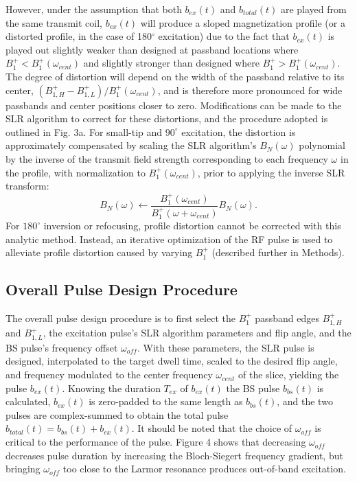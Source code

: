 \documentclass[a4paper,12pt]{article}
\newcommand{\bfullt}{b_{total}(t)}
\newcommand{\bext}{b_{ex}(t)}
\begin{document}
\par However, under the assumption that both $\bext$ and $\bfullt$ are played from the same transmit coil, 
 $\bext$ will produce a sloped magnetization profile (or a distorted profile, in the case of 180$^\circ$ excitation) due to the fact that $\bext$ is played out slightly weaker than designed at passband locations where $B_1^+ <  B_1^+(\omega_{cent})$ and slightly stronger than designed where $B_1^+ > B_1^+(\omega_{cent})$. 
The degree of distortion will depend on the width of the passband relative to its center, $(B_{1,H}^+ - B_{1,L}^+) / B_1^+(\omega_{cent})$, and is therefore more pronounced for wide passbands and center positions closer to zero. Modifications can be made to the SLR algorithm to correct for these distortions, and the procedure adopted is outlined in Fig. 3a.
For small-tip and $90^\circ$ excitation, 
the distortion is approximately compensated by scaling the SLR algorithm's $B_N(\omega)$ 
polynomial by the inverse of the transmit field strength corresponding to each frequency $\omega$ in the profile,
with normalization to $B_1^+(\omega_{cent})$, prior to applying the inverse SLR transform:
\begin{equation*}
    B_N(\omega) \leftarrow \frac{B_1^+(\omega_{cent})}{B_1^+(\omega + \omega_{cent})}B_N(\omega).
\end{equation*}
For $180^\circ$ inversion or refocusing,
profile distortion cannot be corrected with this analytic method. 
Instead, an iterative optimization of the RF pulse is used to alleviate 
profile distortion caused by varying $B_1^+$ (described further in Methods).

\subsection*{Overall Pulse Design Procedure} 
The overall pulse design procedure is to first select the $B_1^+$ passband edges $B_{1,H}^+$ and $B_{1,L}^+$,
the excitation pulse's SLR algorithm parameters and flip angle, 
and the BS pulse's frequency offset $\omega_{off}$.
With these parameters, the SLR pulse is designed, interpolated to the target dwell time,
scaled to the desired flip angle, and frequency modulated to the center frequency $\omega_{cent}$ of the slice,
yielding the pulse $b_{ex}(t)$.
Knowing the duration $T_{ex}$ of $b_{ex}(t)$
the BS pulse $b_{bs}(t)$ is calculated,
$b_{ex}(t)$ is zero-padded to the same length as $b_{bs}(t)$,
and the two pulses are complex-summed to obtain the total pulse 
$b_{total}(t) = b_{bs}(t) + b_{ex}(t)$.
It should be noted that the choice of $\omega_{off}$ is critical to the performance of the pulse. 
Figure 4 shows that decreasing $\omega_{off}$ decreases pulse duration by increasing the Bloch-Siegert frequency gradient, 
but bringing $\omega_{off}$ too close to the Larmor resonance produces out-of-band excitation.
\end{document}
